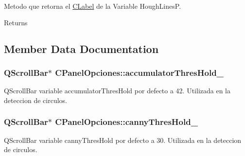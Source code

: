 Metodo que retorna el \hyperlink{classCLabel}{C\+Label} de la Variable Hough\+LinesP. 

\begin{DoxyReturn}{Returns}

\end{DoxyReturn}


\subsection{Member Data Documentation}
\subsubsection[{\texorpdfstring{accumulator\+Thres\+Hold\+\_\+}{accumulatorThresHold_}}]{\setlength{\rightskip}{0pt plus 5cm}Q\+Scroll\+Bar$\ast$ C\+Panel\+Opciones\+::accumulator\+Thres\+Hold\+\_\+\hspace{0.3cm}{\ttfamily [private]}}\hypertarget{classCPanelOpciones_a1d0f21eb4ba18ebcfd6068817f17bef2}{}\label{classCPanelOpciones_a1d0f21eb4ba18ebcfd6068817f17bef2}


Q\+Scroll\+Bar variable accumulator\+Thres\+Hold por defecto a 42. Utilizada en la deteccion de circulos. 

\subsubsection[{\texorpdfstring{canny\+Thres\+Hold\+\_\+}{cannyThresHold_}}]{\setlength{\rightskip}{0pt plus 5cm}Q\+Scroll\+Bar$\ast$ C\+Panel\+Opciones\+::canny\+Thres\+Hold\+\_\+\hspace{0.3cm}{\ttfamily [private]}}\hypertarget{classCPanelOpciones_a02b5fec0793280de210c64541fc47155}{}\label{classCPanelOpciones_a02b5fec0793280de210c64541fc47155}


Q\+Scroll\+Bar variable canny\+Thres\+Hold por defecto a 30. Utilizada en la deteccion de circulos. 

